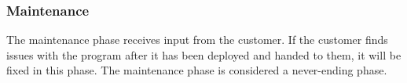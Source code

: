 \subsubsection{Maintenance}


The maintenance phase receives input from the customer\cite{waterfallexplained}. If the customer finds issues with the program after it has been deployed and handed to them, it will be fixed in this phase\cite{waterfallexplained}. The maintenance phase is considered a never-ending phase\cite{waterfallexplained}.